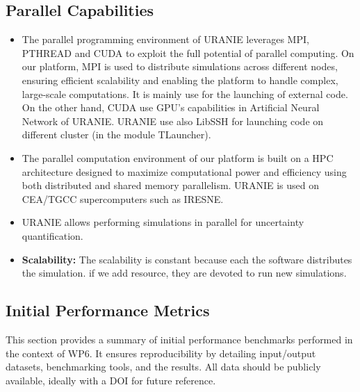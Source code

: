 \subsection{Parallel Capabilities}
\label{sec:WP6:Uranie:performances}


\begin{itemize}
    \item The parallel programming environment of URANIE leverages MPI, PTHREAD
    and CUDA to exploit the full potential of parallel computing. 
    On our platform, MPI is used to distribute simulations across different nodes,
    ensuring efficient scalability and enabling the platform to handle complex, large-scale computations. It is mainly use for the launching of external code.
    On the other hand, CUDA use GPU's capabilities in Artificial Neural Network of URANIE.
    URANIE use also LibSSH for launching code on different cluster (in the module TLauncher).

    \item The parallel computation environment of our platform is built on a HPC architecture designed to maximize computational power and efficiency
    using both distributed and shared memory parallelism. URANIE is used on CEA/TGCC supercomputers such as IRESNE.

    \item URANIE allows performing simulations in parallel for uncertainty quantification.
    \item \textbf{Scalability:} The scalability is constant because each the software distributes the simulation. if we add resource, they are devoted to run new simulations.
\end{itemize}


\subsection{Initial Performance Metrics}
\label{sec:WP6:Uranie:metrics}

This section provides a summary of initial performance benchmarks performed in the context of WP6. It ensures reproducibility by detailing input/output datasets, benchmarking tools, and the results. All data should be publicly available, ideally with a DOI for future reference.

